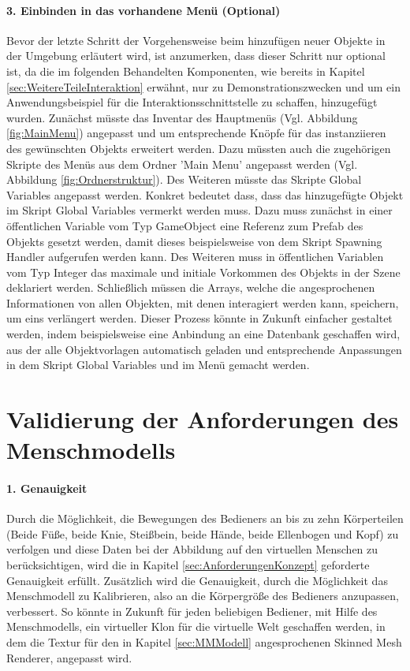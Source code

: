\paragraph{3. Einbinden in das vorhandene Menü (Optional)}
\noindent Bevor der letzte Schritt der Vorgehensweise beim hinzufügen neuer Objekte in der Umgebung erläutert wird, ist anzumerken, dass dieser Schritt nur optional ist, da die im folgenden Behandelten Komponenten, wie bereits in Kapitel \ref{sec:WeitereTeileInteraktion} erwähnt, nur zu Demonstrationszwecken und um ein Anwendungsbeispiel für die Interaktionsschnittstelle zu schaffen, hinzugefügt wurden. Zunächst müsste das Inventar des Hauptmenüs (Vgl. Abbildung \ref{fig:MainMenu}) angepasst und um entsprechende Knöpfe für das instanziieren des gewünschten Objekts erweitert werden. Dazu müssten auch die zugehörigen Skripte des Menüs aus dem Ordner 'Main Menu' angepasst werden (Vgl. Abbildung \ref{fig:Ordnerstruktur}). Des Weiteren müsste das Skripte Global Variables angepasst werden. Konkret bedeutet dass, dass das hinzugefügte Objekt im Skript Global Variables vermerkt werden muss. Dazu muss zunächst in einer öffentlichen Variable vom Typ GameObject eine Referenz zum Prefab des Objekts gesetzt werden, damit dieses beispielsweise von dem Skript Spawning Handler aufgerufen werden kann. Des Weiteren muss in öffentlichen Variablen vom Typ Integer das maximale und initiale Vorkommen des Objekts in der Szene deklariert werden. Schließlich müssen die Arrays, welche die angesprochenen Informationen von allen Objekten, mit denen interagiert werden kann, speichern, um eins verlängert werden. Dieser Prozess könnte in Zukunft einfacher gestaltet werden, indem beispielsweise eine Anbindung an eine Datenbank geschaffen wird, aus der alle Objektvorlagen automatisch geladen und entsprechende Anpassungen in dem Skript Global Variables und im Menü gemacht werden.

\section{Validierung der Anforderungen des Menschmodells}\label{sec:ValidMensch}

\paragraph{1. Genauigkeit}
\noindent Durch die Möglichkeit, die Bewegungen des Bedieners an bis zu zehn Körperteilen (Beide Füße, beide Knie, Steißbein, beide Hände, beide Ellenbogen und Kopf) zu verfolgen und diese Daten bei der Abbildung auf den virtuellen Menschen zu berücksichtigen, wird die in Kapitel \ref{sec:AnforderungenKonzept} geforderte Genauigkeit erfüllt. Zusätzlich wird die Genauigkeit, durch die Möglichkeit das Menschmodell zu Kalibrieren, also an die Körpergröße des Bedieners anzupassen, verbessert. So könnte in Zukunft für jeden beliebigen Bediener, mit Hilfe des Menschmodells, ein virtueller Klon für die virtuelle Welt geschaffen werden, in dem die Textur für den in Kapitel \ref{sec:MMModell} angesprochenen Skinned Mesh Renderer, angepasst wird.
	

